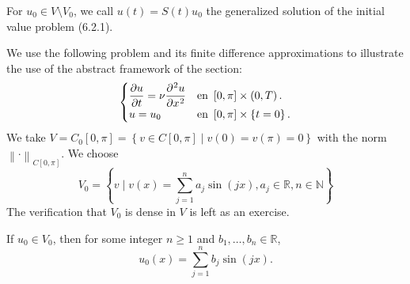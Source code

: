\begin{frame}
	\frametitle{\insertsection}

	\begin{definition}
		For $u_{0}\in V\setminus V_{0}$, we call
		$u\left(t\right)=S\left(t\right)u_{0}$ the generalized solution of the initial value problem
		(6.2.1).
	\end{definition}

	\begin{example}
		We use the following problem and its finite difference
		approximations to illustrate the use of the abstract framework of
		the section:
		\begin{equation*}
			\begin{cases}\displaystyle
				\diffp{u}{t}=
				\nu
				\diffp[2]{u}{x} &
				\text{en }\left[0,\pi\right]\times\left(0,T\right). \\
				u=u_{0}         &
				\text{en }\left[0,\pi\right]\times\left\{t=0\right\}.
			\end{cases}
		\end{equation*}
		We take $V=C_{0}\left[0,\pi\right]=\left\{v\in C\left[0,\pi\right]\mid v\left(0\right)=v\left(\pi\right)=0\right\}$
		with the norm $\left\|\cdot\right\|_{C\left[0,\pi\right]}$.
		We choose
		\begin{equation*}
			V_{0}=
			\left\{
			v\mid
			v\left(x\right)=
			\sum_{j=1}^{n}a_{j}\sin\left(jx\right),
			a_{j}\in\mathbb{R},
			n\in\mathbb{N}
			\right\}
		\end{equation*}
		The verification that $V_{0}$ is dense in $V$ is left as an exercise.
	\end{example}
	If $u_{0}\in V_{0}$, then for some integer $n\geq 1$ and $b_{1},\dotsc,b_{n}\in\mathbb{R}$,
	\begin{equation*}
		u_{0}\left(x\right)=
		\sum_{j=1}^{n}
		b_{j}\sin\left(jx\right).
	\end{equation*}
\end{frame}

